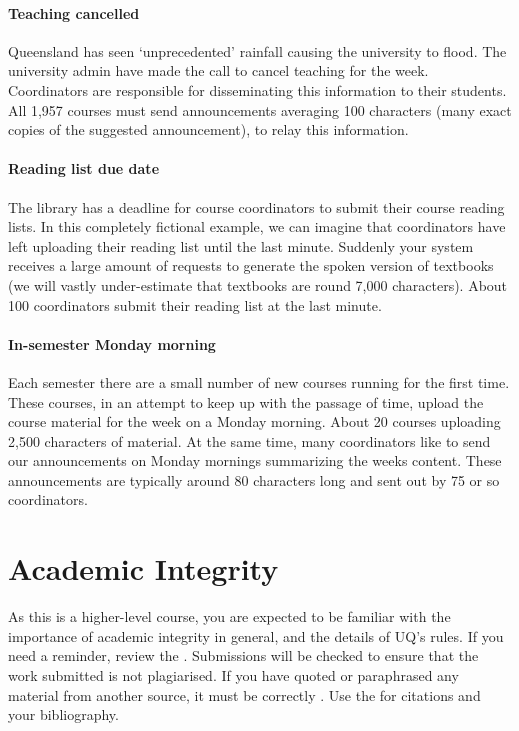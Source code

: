 \documentclass{csse4400}
\begin{document}
\paragraph{Teaching cancelled}
Queensland has seen `unprecedented' rainfall causing the university to flood.
The university admin have made the call to cancel teaching for the week.
Coordinators are responsible for disseminating this information to their students.
All 1,957 courses must send announcements averaging 100 characters (many exact copies of the suggested announcement),
to relay this information.

\paragraph{Reading list due date}
The library has a deadline for course coordinators to submit their course reading lists.
In this completely fictional example,
we can imagine that coordinators have left uploading their reading list until the last minute.
Suddenly your system receives a large amount of requests to generate the spoken version of textbooks (we will vastly under-estimate that textbooks are round 7,000 characters).
About 100 coordinators submit their reading list at the last minute.

\paragraph{In-semester Monday morning}
Each semester there are a small number of new courses running for the first time.
These courses, in an attempt to keep up with the passage of time,
upload the course material for the week on a Monday morning.
About 20 courses uploading 2,500 characters of material.
At the same time, many coordinators like to send our announcements on Monday mornings summarizing the weeks content.
These announcements are typically around 80 characters long and sent out by 75 or so coordinators.


\section{Academic Integrity}
As this is a higher-level course, you are expected to be familiar with the importance of academic integrity in general, and the details of UQ's rules.
If you need a reminder, review the .
Submissions will be checked to ensure that the work submitted is not plagiarised.
If you have quoted or paraphrased any material from another source, it must be correctly .
Use the  for citations and your bibliography.
\end{document}

